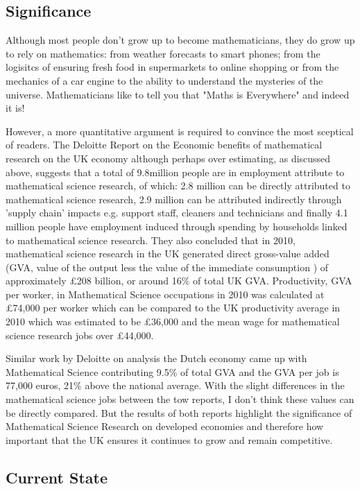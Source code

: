 \documentclass[11pt]{article} %
\begin{document}
	
	\subsection{Significance \label{significance}}
	
Although most people don't grow up to become mathematicians, they do grow up to rely on mathematics: from weather forecasts to smart phones; from the logisitcs of ensuring fresh food in supermarkets to online shopping or from the mechanics of a car engine to  the ability to understand the mysteries of the universe. Mathematicians like to tell you that "Maths is Everywhere" and indeed it is! 

However, a more quantitative argument is required to convince the most sceptical of readers. The Deloitte Report on the Economic benefits of mathematical research on the UK economy \cite{deloitteuk} although perhaps over estimating, as discussed above, suggests that a total of 9.8million people are in employment attribute to mathematical science research, of which: 2.8 million can be directly attributed to mathematical science research, 2.9 million can be attributed indirectly through 'supply chain' impacts e.g. support staff, cleaners and technicians and finally 4.1 million people have employment induced  through spending by households linked to mathematical science research. They also concluded that in 2010, mathematical science research in the UK generated direct gross-value added (GVA, value of the output less the value of the immediate consumption ) of approximately £208 billion, or around 16\% of total UK GVA.  Productivity, GVA per worker, in Mathematical Science occupations in 2010 was calculated at £74,000 per worker which can be compared to the UK productivity average in 2010 which was estimated to be £36,000 and the mean wage for mathematical science research jobs over £44,000. 
 
 Similar work by Deloitte on analysis the Dutch economy \cite{deloitteNL} came up with Mathematical Science contributing 9.5\% of total GVA and the GVA per job is 77,000 euros, 21\% above the national average. With the slight differences in the mathematical science jobs between the tow reports, I don't think these values can be directly compared. But the results of both reports highlight the significance of Mathematical Science Research on developed economies and therefore how important that the UK ensures it continues to grow and remain competitive.
 
 
	
	 
	\subsection{Current State \label{current state }}
	
\end{document}
